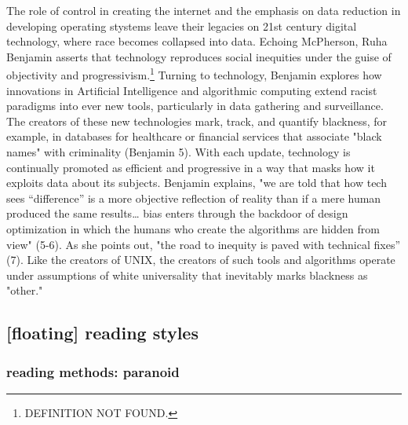 \documentclass[11pt]{article}
\begin{document}
The role of control in creating the internet and the emphasis on data
reduction in developing operating stystems leave their legacies on
21st century digital technology, where race becomes collapsed into
data. Echoing McPherson, Ruha Benjamin asserts that technology
reproduces social inequities under the guise of objectivity and
progressivism.\footnote{DEFINITION NOT FOUND.} Turning to technology, Benjamin explores how
innovations in Artificial Intelligence and algorithmic computing
extend racist paradigms into ever new tools, particularly in data
gathering and surveillance. The creators of these new technologies
mark, track, and quantify blackness, for example, in databases for
healthcare or financial services that associate "black names" with
criminality (Benjamin 5). With each update, technology is continually
promoted as efficient and progressive in a way that masks how it
exploits data about its subjects. Benjamin explains, "we are told that
how tech sees “difference” is a more objective reflection of reality
than if a mere human produced the same results\ldots{} bias enters through
the backdoor of design optimization in which the humans who create the
algorithms are hidden from view" (5-6). As she points out, "the road
to inequity is paved with technical fixes” (7). Like the creators of
UNIX, the creators of such tools and algorithms operate under
assumptions of white universality that inevitably marks blackness as
"other."


\subsection{[floating] reading styles}
\label{sec:org855f7a8}
\subsubsection{reading methods: paranoid}
\label{sec:org42d37f8}
\end{document}
